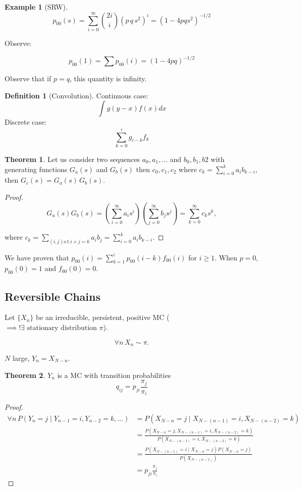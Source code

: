 \documentclass{article}
\theoremstyle{definition}
\newtheorem{exmp}{Example}[section]
\newtheorem{defn}{Definition}[section]
\newtheorem{theorem}{Theorem}[section]
\begin{document}
\begin{exmp}[SRW]
$$
p_{00}(s) = \sum_{i=0}^\infty { 2i \choose i} \left( p \, q \, s^2 \right)^i = (1-4pqs^2)^{-1/2}
$$

Observe:

$$
p_{00}(1) = \sum p_{00}(i) = (1-4pq)^{-1/2}
$$

Observe that if $p=q$, this quantity is infinity.

\begin{defn}[Convolution]
Continuous case:
$$
\int g(y-x) f(x) dx 
$$
Discrete case:
$$
\sum_{k=0}^i g_{i-k} f_k
$$
\end{defn}

\begin{theorem}
Let us consider two sequences $a_0, a_1, \ldots$ and $b_0, b_1, b2$ with generating functions $G_a(s)$ and $G_b(s)$ then 
$c_0,c_1,c_2$ where $c_k = \sum_{i=0}^k a_i b_{k-i}$, then 
$G_c(s) = G_a(s) \, G_b(s)$.

\begin{proof}
$$
G_a(s) G_b(s) = \left( \sum_{i=0}^\infty a_i s^i \right) \left( \sum_{j=0}^\infty b_j s^j \right) = \sum_{k=0}^\infty c_k s^k,
$$

where $c_k = \sum_{(i,j) \text{s.t.} i+j=k} a_i b_j = \sum_{i=0}^k a_i b_{k-i}$.
\end{proof}
\end{theorem}

We have proven that $p_{00}(i) = \sum_{k=1}^i p_{00}(i-k) f_{00}(i)$ for $i \ge 1$. When $p=0$, $p_{00}(0) = 1$ and $f_{00}(0) = 0$.

\end{exmp} 

\subsection{Reversible Chains}

Let $\{X_n\}$ be an irreducible, persistent, positive MC ($\implies !\exists \text{ stationary distribution } \pi$). 

$$
\forall n \, X_n \sim \pi.
$$

$N$ large, $Y_n = X_{N-n}$.

\begin{theorem}
$Y_n$ is a MC with transition probabilities 
$$
q_{ij} = p_{ji} \frac{\pi_j}{\pi_i}
$$
\begin{proof}

\begin{align*}
    \forall n \, P\left( Y_n = j \mid Y_{n-1} = i, Y_{n-2} = k, \ldots \right) 
    &= P \left( X_{N-n} = j \mid X_{N-(n-1)} = i, X_{N-(n-2)}=k \right) \\
    &= \frac{P \left( X_{N-n} = j, X_{N-(n-1)} = i, X_{N-(n-2)}=k \right) }{P \left( X_{N-(n-1)}=i, X_{N-(n-2)} = k\right)} \\
    &= \frac{P(X_{N-(n-1)} = i \mid X_{N-n} = j) P(X_{N-n} = j) }{P(X_{N-(n-1)})} \\
    &= p_{ji}  \frac{\pi_j}{\pi_i}
\end{align*}

\end{proof}
\end{theorem}
\end{document}

